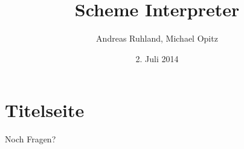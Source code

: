 \documentclass[t,handout]{beamer}
\title[Scheme Interpreter]{Scheme Interpreter}
\author[A. Ruhland, M. Opitz]{
    Andreas Ruhland, Michael Opitz
}
\institute[TUM]{Technische Universität München}
\date[2.07.2014]{2. Juli 2014}
\begin{document}
\section{Titelseite}
\frame{\titlepage}



\begin{frame}[c]
    \begin{center}
        Noch Fragen?\par
    \end{center}
\end{frame}

%
%
\end{document}
